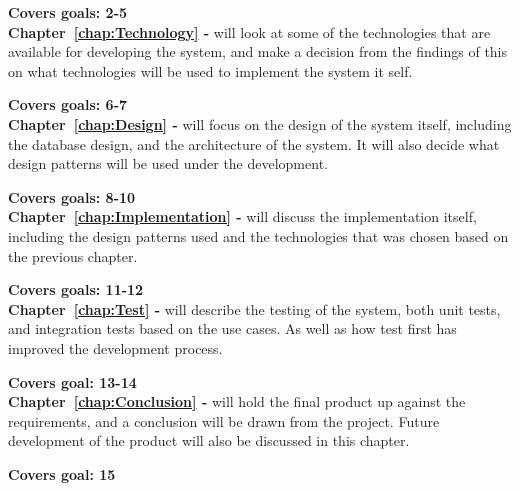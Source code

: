 \textbf{Covers goals: 2-5}\\

\textbf{Chapter~\ref{chap:Technology} - } will look at some of the technologies that are available for developing the system, and make a decision from the findings of this on what technologies will be used to implement the system it self.

\textbf{Covers goals: 6-7}\\

\textbf{Chapter~\ref{chap:Design} - } will focus on the design of the system itself, including the database design, and the architecture of the system. It will also decide what design patterns will be used under the development.

\textbf{Covers goals: 8-10}\\

\textbf{Chapter~\ref{chap:Implementation} - } will discuss the implementation itself, including the design patterns used and the technologies that was chosen based on the previous chapter.

\textbf{Covers goals: 11-12}\\

\textbf{Chapter~\ref{chap:Test} - } will describe the testing of the system, both unit tests, and integration tests based on the use cases. As well as how test first has improved the development process.

\textbf{Covers goal: 13-14}\\

\textbf{Chapter~\ref{chap:Conclusion} - } will hold the final product up against the requirements, and a conclusion will be drawn from the project. Future development of the product will also be discussed in this chapter.

\textbf{Covers goal: 15}
